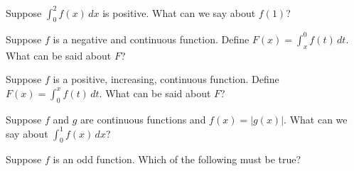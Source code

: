 \documentclass{ximera}
\newcommand{\recommendation}[1]{}
\begin{document}
\begin{shuffle}
\begin{problem}
  Suppose $\int_0^2 f(x) \, dx$ is positive.  What can we say about $f(1)$?
  \begin{multipleChoice}
  \end{multipleChoice}
\end{problem}



\begin{problem}
  Suppose $f$ is a negative and continuous function.  Define $F(x) = \int_x^0 f(t) \, dt$.  What can be said about $F$?
  \begin{multipleChoice}
  \end{multipleChoice}
\end{problem}

\begin{problem}
  Suppose $f$ is a positive, increasing, continuous function.  Define $F(x) = \int_0^x f(t) \, dt$.  What can be said about $F$?
  \begin{multipleChoice}
  \end{multipleChoice}
\end{problem}

\begin{problem}
  Suppose $f$ and $g$ are continuous functions and $f(x) = |g(x)|$.  What can we say about $\int_0^1 f(x) \, dx$?
  \begin{multipleChoice}
  \end{multipleChoice}
\end{problem}


\begin{problem}
  Suppose $f$ is an odd function. Which of the following must be true?
  \begin{multipleChoice}
  \end{multipleChoice}
\end{problem}


\end{shuffle}
\end{document}

